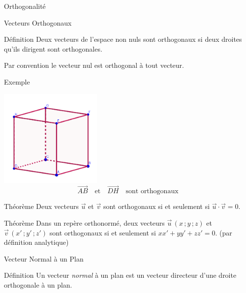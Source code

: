 \documentclass{coursbook}
\begin{document}
    \vfill
    \pagebreak
    \begin{Gpartie}{Orthogonalité} 
        \begin{Spartie}{Vecteurs Orthogonaux} 
            \begin{SSpartie}{Définition} 
                Deux vecteurs de l'espace non nuls sont orthogonaux si deux droites qu'ils dirigent sont orthogonales.

                Par convention le vecteur nul est orthogonal à tout vecteur.

                \begin{SSSpartie}{Exemple} 
                    \begin{center}
                            \includegraphics[width=5cm]{rsc/12fig2.png}
                            \[\overrightarrow{AB}\quad\text{et}\quad\overrightarrow{DH}\quad\text{sont orthogonaux}\]
                        \parbox{\linewidth}{}
                    \end{center}
                \end{SSSpartie}
            \end{SSpartie}
            \begin{SSpartie}{Théorème} 
                Deux vecteurs $\vec{u}$ et $\vec{v}$ sont orthogonaux si et seulement si $\vec{u}\cdot\vec{v}=0$.
            \end{SSpartie}
            \begin{SSpartie}{Théorème} 
                Dans un repère orthonormé, deux vecteurs $\vec{u}\,\left(x\,;y\,;z\right)$ et $\vec{v}\,\left(x'\,;y'\,;z'\right)$ sont orthogonaux si et seulement si $xx'+yy'+zz'=0$. \quad(par définition analytique)
            \end{SSpartie}
        \end{Spartie}
        \vfill
        \pagebreak
        \begin{Spartie}{Vecteur Normal à un Plan} 
            \begin{SSpartie}{Définition} 
                Un vecteur \emph{normal} à un plan est un vecteur directeur d'une droite orthogonale à un plan.
    

\end{SSpartie}
\end{Spartie}
\end{Gpartie}
\end{document}
